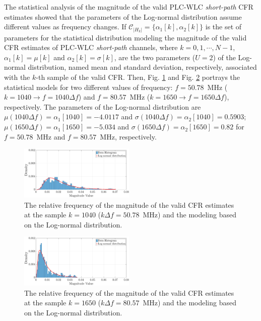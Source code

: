 \documentclass[journal]{IEEEtran}
\begin{document}
The statistical analysis of the magnitude of the valid \ac{PLC}-\ac{WLC} \textit{short-path} \ac{CFR} estimates showed that the parameters of the Log-normal distribution assume different values as frequency changes. If $\mathcal{C}_{|H_k|} = \{\alpha_1[k],\alpha_2[k]\}$ is the set of parameters for the statistical distribution modeling the magnitude of the valid \ac{CFR} estimates of \ac{PLC}-\ac{WLC} \textit{short-path} channels, where $k=0,1,\cdots,N-1$,  $\alpha_1[k] = \mu[k]$ and $\alpha_2[k] = \sigma[k]$, are the two parameters ($U=2$) of the Log-normal distribution, named mean and standard deviation, respectively, associated with the $k$-th sample of the valid \ac{CFR}. Then, Fig. \ref{mag_examplesW} and Fig. \ref{mag_example2sW} portrays the statistical models for two different values of frequency: $f=50.78$~MHz ($k=1040 \rightarrow f = 1040\Delta f$) and $f=80.57$~MHz ($k=1650 \rightarrow f = 1650\Delta f$), respectively. The parameters of the Log-normal distribution are  $\mu(1040 \Delta f) = \alpha_1[1040]=-4.0117$ and $\sigma( 1040 \Delta f) = \alpha_2[1040] = 0.5903$; $\mu(1650 \Delta f) = \alpha_1[1650] = -5.034$ and $\sigma( 1650 \Delta f) = \alpha_2[1650]=0.82$ for $f=50.78$~MHz and $f=80.57$~MHz, respectively.

\begin{figure}[h!]
	\centering
	\includegraphics[width=0.49\textwidth]{images/Mag_histsW_2.eps}
	\caption{The relative frequency of the magnitude of the valid CFR estimates at the sample $k = 1040$ ($k\Delta f= 50.78$~MHz) and the modeling based on the Log-normal distribution.}
	\label{mag_examplesW}
\end{figure}

\begin{figure}[h!]
	\centering
	\includegraphics[width=0.49\textwidth]{images/Mag_hist2sW_2.eps}
	\caption{ The relative frequency of the magnitude of the valid CFR estimates at the sample $k = 1650$ ($k\Delta f= 80.57$~MHz) and the modeling based on the Log-normal distribution.}
	\label{mag_example2sW}
\end{figure}
\end{document}
